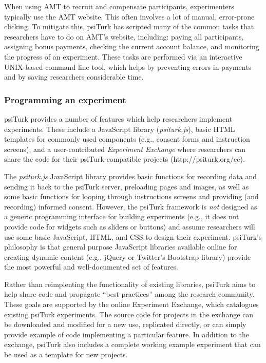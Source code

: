\documentclass[twocolumn]{svjour3}          %
\newcommand{\psiturk}[0]{\textsf{psiTurk}}
\newcommand{\psiturkjs}[0]{\emph{psiturk.js}}
\begin{document}
When using AMT to recruit and compensate participants,
experimenters typically use the AMT website.  This often
involves a lot of manual, error-prone clicking.  To mitigate this, \psiturk{}
has scripted many of the common
tasks that researchers have to do on AMT's website, including:
paying all participants, assigning bonus payments, checking the current
account balance, and monitoring the progress of an experiment.
These tasks are performed via an interactive UNIX-based command
line tool, which helps by preventing errors in payments and
by saving researchers considerable time.

\subsubsection{Programming an experiment}
\psiturk{} provides a number of features which help researchers implement 
experiments.  These include a JavaScript library (\psiturkjs{}), basic HTML templates 
for commonly used components (e.g., consent forms and instruction screens), 
and a user-contributed \emph{Experiment Exchange} where researchers can share the code for their \psiturk{}-compatible
projects (\textsf{http://psiturk.org/ee}). 

The \psiturkjs{} JavaScript library provides basic functions for recording data and sending it back to the \psiturk{} server,
preloading pages and images, as well as some basic functions for looping through instructions
screens and providing (and recording) informed consent.
However, the \psiturk{} framework is \emph{not} designed as a generic
programming interface for building 
experiments (e.g., it does not provide code for widgets such as sliders or buttons) and assume
researchers will use some basic JavaScript, HTML, and CSS to design their experiment.  \psiturk{}'s
philosophy is that general purpose JavaScript libraries available online for creating dynamic content (e.g., jQuery or
Twitter's Bootstrap library) provide the most powerful and well-documented set of features.  

Rather than reimplenting the functionality of existing libraries, \psiturk{} aims to help share code and propagate ``best practices'' among the research community.
These goals are supported by the online Experiment Exchange, which catalogues existing \psiturk{} experiments. The source code for projects in the exchange can be downloaded and modified for a new use,
replicated directly, or can simply provide example of code implementing a particular 
feature.  In addition to the exchange, \psiturk{} also includes a complete working example 
experiment that can be used as a template for new projects.
\end{document}
